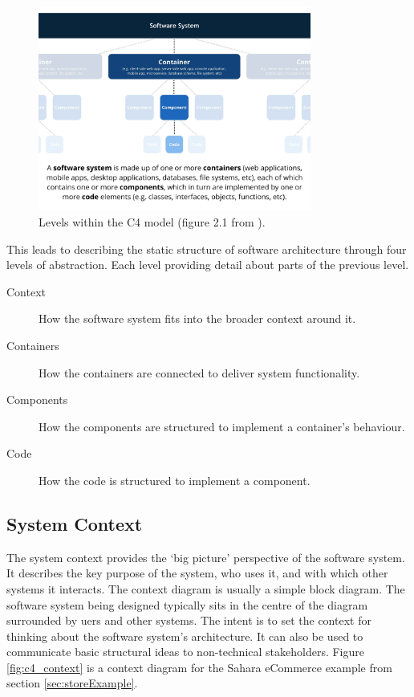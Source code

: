 \begin{figure}[h]
    \centering
    \includegraphics[trim=0 8 0 5,clip,width=0.8\textwidth]{images/c4_terminology.jpg}
    \caption{Levels within the C4 model (figure 2.1 from \cite{brown2022c4}).}
    \label{fig:c4terms}
\end{figure}

\noindent
This leads to describing the static structure of software architecture through four levels of abstraction.
Each level providing detail about parts of the previous level.
\begin{description}
    \item[Context] How the software system fits into the broader context around it.
    \item[Containers] How the containers are connected to deliver system functionality.
    \item[Components] How the components are structured to implement a container's behaviour.
    \item[Code] How the code is structured to implement a component.
\end{description}

\subsection{System Context}
The system context provides the `big picture' perspective of the software system.
It describes the key purpose of the system, who uses it, and with which other systems it interacts.
The context diagram is usually a simple block diagram.
The software system being designed typically sits in the centre of the diagram surrounded by uers and other systems.
The intent is to set the context for thinking about the software system's architecture.
It can also be used to communicate basic structural ideas to non-technical stakeholders.
Figure \ref{fig:c4_context} is a context diagram for the Sahara eCommerce example from section \ref{sec:storeExample}.


